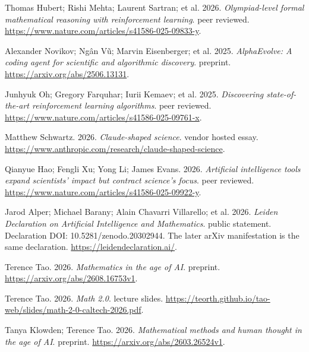 {\begin{description}[leftmargin=2em,labelwidth=1.5em,itemsep=1pt,parsep=0pt]
\item[74.] \hypertarget{ref-alphaproof2025}{} Thomas Hubert; Rishi Mehta; Laurent Sartran; et al. 2026. \textit{Olympiad-level formal mathematical reasoning with reinforcement learning}. peer reviewed. \url{https://www.nature.com/articles/s41586-025-09833-y}.

\item[75.] \hypertarget{ref-alphaevolve2025}{} Alexander Novikov; Ngân Vũ; Marvin Eisenberger; et al. 2025. \textit{AlphaEvolve: A coding agent for scientific and algorithmic discovery}. preprint. \url{https://arxiv.org/abs/2506.13131}.

\item[76.] \hypertarget{ref-discorl2025}{} Junhyuk Oh; Gregory Farquhar; Iurii Kemaev; et al. 2025. \textit{Discovering state-of-the-art reinforcement learning algorithms}. peer reviewed. \url{https://www.nature.com/articles/s41586-025-09761-x}.

\item[77.] \hypertarget{ref-schwartz2026}{} Matthew Schwartz. 2026. \textit{Claude-shaped science}. vendor hosted essay. \url{https://www.anthropic.com/research/claude-shaped-science}.

\item[78.] \hypertarget{ref-hao2026}{} Qianyue Hao; Fengli Xu; Yong Li; James Evans. 2026. \textit{Artificial intelligence tools expand scientists’ impact but contract science’s focus}. peer reviewed. \url{https://www.nature.com/articles/s41586-025-09922-y}.

\item[79.] \hypertarget{ref-leiden2026}{} Jarod Alper; Michael Barany; Alain Chavarri Villarello; et al. 2026. \textit{Leiden Declaration on Artificial Intelligence and Mathematics}. public statement. Declaration DOI: 10.5281/zenodo.20302944. The later arXiv manifestation is the same declaration. \url{https://leidendeclaration.ai/}.

\item[80.] \hypertarget{ref-taoicm2026}{} Terence Tao. 2026. \textit{Mathematics in the age of AI}. preprint. \url{https://arxiv.org/abs/2608.16753v1}.

\item[81.] \hypertarget{ref-taomath2026}{} Terence Tao. 2026. \textit{Math 2.0}. lecture slides. \url{https://teorth.github.io/tao-web/slides/math-2-0-caltech-2026.pdf}.

\item[82.] \hypertarget{ref-klowdentao2026}{} Tanya Klowden; Terence Tao. 2026. \textit{Mathematical methods and human thought in the age of AI}. preprint. \url{https://arxiv.org/abs/2603.26524v1}.


\end{description}}
